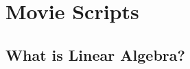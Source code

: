 \documentclass[12pt]{book}
\newcommand{\1}{{\mathrm 1\hspace*{-0.4ex}%
\rule{0.1ex}{1.52ex}\hspace*{0.2ex}}}
\begin{document}
%



 






%

%

%


% 

%













%








\appendix







\small


%

%

%
%

%
%
%
%

\chapter{Movie Scripts}

\footnotesize
\section{What is Linear Algebra?}
\end{document}
